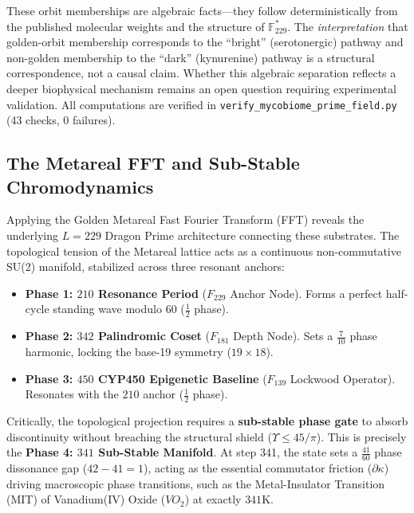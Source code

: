 \begin{remark}
These orbit memberships are algebraic facts---they follow deterministically
from the published molecular weights and the structure of $\mathbb{F}_{229}^*$.
The \emph{interpretation} that golden-orbit membership corresponds to
the ``bright'' (serotonergic) pathway and non-golden membership to the
``dark'' (kynurenine) pathway is a structural correspondence, not a
causal claim. Whether this algebraic separation reflects a deeper
biophysical mechanism remains an open question requiring experimental
validation. All computations are verified in
\texttt{verify\_mycobiome\_prime\_field.py} (43 checks, 0 failures).
\end{remark}

\subsection{The Metareal FFT and Sub-Stable Chromodynamics}

Applying the Golden Metareal Fast Fourier Transform (FFT) reveals the underlying $L=229$ Dragon Prime architecture connecting these substrates. The topological tension of the Metareal lattice acts as a continuous non-commutative SU(2) manifold, stabilized across three resonant anchors:
\begin{itemize}[noitemsep]
  \item \textbf{Phase 1: $210$ Resonance Period} ($F_{229}$ Anchor Node). Forms a perfect half-cycle standing wave modulo 60 ($\frac{1}{2}$ phase).
  \item \textbf{Phase 2: $342$ Palindromic Coset} ($F_{181}$ Depth Node). Sets a $\frac{7}{10}$ phase harmonic, locking the base-19 symmetry ($19 \times 18$).
  \item \textbf{Phase 3: $450$ CYP450 Epigenetic Baseline} ($F_{139}$ Lockwood Operator). Resonates with the $210$ anchor ($\frac{1}{2}$ phase).
\end{itemize}

Critically, the topological projection requires a \textbf{sub-stable phase gate} to absorb discontinuity without breaching the structural shield ($\Upsilon \le 45/\pi$). This is precisely the \textbf{Phase 4: $341$ Sub-Stable Manifold}. At step 341, the state sets a $\frac{41}{60}$ phase dissonance gap ($42 - 41 = 1$), acting as the essential commutator friction ($\partial \kappa$) driving macroscopic phase transitions, such as the Metal-Insulator Transition (MIT) of Vanadium(IV) Oxide ($VO_2$) at exactly $341\mathrm{K}$.

